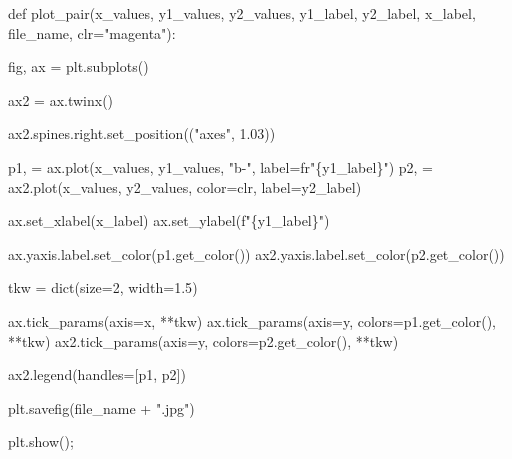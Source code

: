 \documentclass[
  letterpaper,
]{report}
\newenvironment{Shaded}{\begin{snugshade}}{\end{snugshade}}
\newcommand{\BuiltInTok}[1]{\textcolor[rgb]{0.00,0.23,0.31}{#1}}
\newcommand{\DecValTok}[1]{\textcolor[rgb]{0.68,0.00,0.00}{#1}}
\newcommand{\FloatTok}[1]{\textcolor[rgb]{0.68,0.00,0.00}{#1}}
\newcommand{\KeywordTok}[1]{\textcolor[rgb]{0.00,0.23,0.31}{#1}}
\newcommand{\NormalTok}[1]{\textcolor[rgb]{0.00,0.23,0.31}{#1}}
\newcommand{\OperatorTok}[1]{\textcolor[rgb]{0.37,0.37,0.37}{#1}}
\newcommand{\SpecialCharTok}[1]{\textcolor[rgb]{0.37,0.37,0.37}{#1}}
\newcommand{\SpecialStringTok}[1]{\textcolor[rgb]{0.13,0.47,0.30}{#1}}
\newcommand{\StringTok}[1]{\textcolor[rgb]{0.13,0.47,0.30}{#1}}
\newcommand{\VerbatimStringTok}[1]{\textcolor[rgb]{0.13,0.47,0.30}{#1}}
\begin{document}
\begin{Shaded}
\begin{Highlighting}[]
\KeywordTok{def}\NormalTok{ plot\_pair(x\_values, }
\NormalTok{              y1\_values,}
\NormalTok{              y2\_values,  }
\NormalTok{              y1\_label, }
\NormalTok{              y2\_label,}
\NormalTok{              x\_label, }
\NormalTok{              file\_name, clr}\OperatorTok{=}\StringTok{"magenta"}\NormalTok{):}

\NormalTok{    fig, ax }\OperatorTok{=}\NormalTok{ plt.subplots()}

\NormalTok{    ax2 }\OperatorTok{=}\NormalTok{ ax.twinx()}

\NormalTok{    ax2.spines.right.set\_position((}\StringTok{"axes"}\NormalTok{, }\FloatTok{1.03}\NormalTok{))}

\NormalTok{    p1, }\OperatorTok{=}\NormalTok{ ax.plot(x\_values, }
\NormalTok{                  y1\_values, }
                  \StringTok{"b{-}"}\NormalTok{, label}\OperatorTok{=}\VerbatimStringTok{fr"}\SpecialCharTok{\{}\NormalTok{y1\_label}\SpecialCharTok{\}}\VerbatimStringTok{"}\NormalTok{)}
\NormalTok{    p2, }\OperatorTok{=}\NormalTok{ ax2.plot(x\_values,}
\NormalTok{                   y2\_values, }
\NormalTok{                   color}\OperatorTok{=}\NormalTok{clr, }
\NormalTok{                   label}\OperatorTok{=}\NormalTok{y2\_label)}

\NormalTok{    ax.set\_xlabel(x\_label)}
\NormalTok{    ax.set\_ylabel(}\SpecialStringTok{f"}\SpecialCharTok{\{}\NormalTok{y1\_label}\SpecialCharTok{\}}\SpecialStringTok{"}\NormalTok{)}

\NormalTok{    ax.yaxis.label.set\_color(p1.get\_color())}
\NormalTok{    ax2.yaxis.label.set\_color(p2.get\_color())}

\NormalTok{    tkw }\OperatorTok{=} \BuiltInTok{dict}\NormalTok{(size}\OperatorTok{=}\DecValTok{2}\NormalTok{, width}\OperatorTok{=}\FloatTok{1.5}\NormalTok{)}

\NormalTok{    ax.tick\_params(axis}\OperatorTok{=}\StringTok{\textquotesingle{}x\textquotesingle{}}\NormalTok{, }\OperatorTok{**}\NormalTok{tkw)}
\NormalTok{    ax.tick\_params(axis}\OperatorTok{=}\StringTok{\textquotesingle{}y\textquotesingle{}}\NormalTok{, colors}\OperatorTok{=}\NormalTok{p1.get\_color(), }\OperatorTok{**}\NormalTok{tkw)}
\NormalTok{    ax2.tick\_params(axis}\OperatorTok{=}\StringTok{\textquotesingle{}y\textquotesingle{}}\NormalTok{, colors}\OperatorTok{=}\NormalTok{p2.get\_color(), }\OperatorTok{**}\NormalTok{tkw)}


\NormalTok{    ax2.legend(handles}\OperatorTok{=}\NormalTok{[p1, p2])}

\NormalTok{    plt.savefig(file\_name }\OperatorTok{+} \StringTok{".jpg"}\NormalTok{)}
        
\NormalTok{    plt.show()}\OperatorTok{;}
\end{Highlighting}
\end{Shaded}
\end{document}
